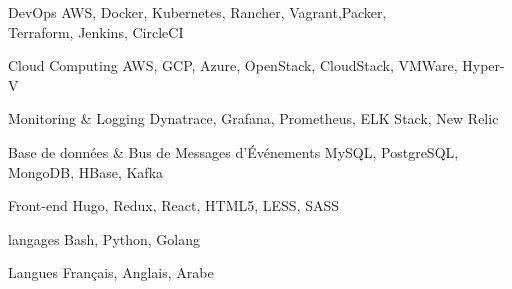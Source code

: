 

\begin{cvskills}

  \cvskill
    {DevOps} %
    {AWS, Docker, Kubernetes, Rancher, Vagrant,Packer, \\ Terraform, Jenkins, CircleCI} %


  \cvskill
    {Cloud Computing} %
    {AWS, GCP, Azure, OpenStack, CloudStack, VMWare, Hyper-V} %

  \cvskill
    {Monitoring \& Logging} %
    {Dynatrace, Grafana, Prometheus, ELK Stack, New Relic} %



  \cvskill
    {Base de données \& Bus de Messages d'Événements} %
    {MySQL, PostgreSQL, MongoDB, HBase, Kafka} %

  \cvskill
    {Front-end} %
    {Hugo, Redux, React, HTML5, LESS, SASS} %

  \cvskill
    {langages} %
    {Bash, Python, Golang} %

  \cvskill
    {Langues} %
    {Français, Anglais, Arabe} %

\end{cvskills}
